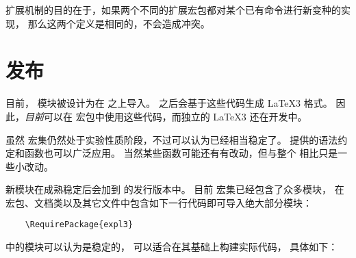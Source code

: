 \documentclass[full]{l3doc}
\begin{document}
%
扩展机制的目的在于，如果两个不同的扩展宏包都对某个已有命令进行新变种的实现，
那么这两个定义是相同的，不会造成冲突。

%
\section{发布}

%
目前， 模块被设计为在 \LaTeXe{} 之上导入。
之后会基于这些代码生成 \LaTeX3 格式。
因此，\emph{目前}可以在 \LaTeXe{} 宏包中使用这些代码，而独立的 \LaTeX3 还在开发中。

%
\begin{bfseries}
    虽然  宏集仍然处于实验性质阶段，不过可以认为已经相当稳定了。
    提供的语法约定和函数也可以广泛应用。
    当然某些函数可能还有有改动，但与整个  相比只是一些小改动。
\end{bfseries}

%
新模块在成熟稳定后会加到  的发行版本中。
目前  宏集已经包含了众多模块，
在 \LaTeXe{} 宏包、文档类以及其它文件中包含如下一行代码即可导入绝大部分模块：
\begin{verbatim}
    \RequirePackage{expl3}
\end{verbatim}
 中的模块可以认为是稳定的，
可以适合在其基础上构建实际代码，
具体如下：
\end{document}
